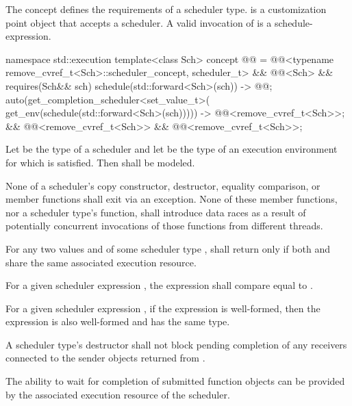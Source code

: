 \pnum
The  concept defines
the requirements of a scheduler type.
 is a customization point object
that accepts a scheduler.
A valid invocation of  is a schedule-expression.
\begin{codeblock}
namespace std::execution {
  template<class Sch>
    concept @@ =
      @@<typename remove_cvref_t<Sch>::scheduler_concept, scheduler_t> &&
      @@<Sch> &&
      requires(Sch&& sch) {
        { schedule(std::forward<Sch>(sch)) } -> @@;
        { auto(get_completion_scheduler<set_value_t>(
            get_env(schedule(std::forward<Sch>(sch))))) }
              -> @@<remove_cvref_t<Sch>>;
      } &&
      @@<remove_cvref_t<Sch>> &&
      @@<remove_cvref_t<Sch>>;
}
\end{codeblock}

\pnum
Let  be the type of a scheduler and
let  be the type of an execution environment
for which 
is satisfied.
Then 
shall be modeled.

\pnum
None of a scheduler's
copy constructor,
destructor,
equality comparison, or
 member functions
shall exit via an exception.
None of these member functions,
nor a scheduler type's  function,
shall introduce data races
as a result of potentially concurrent invocations
of those functions from different threads.

\pnum
For any two values  and 
of some scheduler type ,
 shall return 
only if both  and  share
the same associated execution resource.

\pnum
For a given scheduler expression ,
the expression
shall compare equal to .

\pnum
For a given scheduler expression ,
if the expression  is well-formed,
then the expression 
is also well-formed and has the same type.

\pnum
A scheduler type's destructor shall not block
pending completion of any receivers
connected to the sender objects returned from .
\begin{note}
The ability to wait for completion of submitted function objects
can be provided by the associated execution resource of the scheduler.
\end{note}

